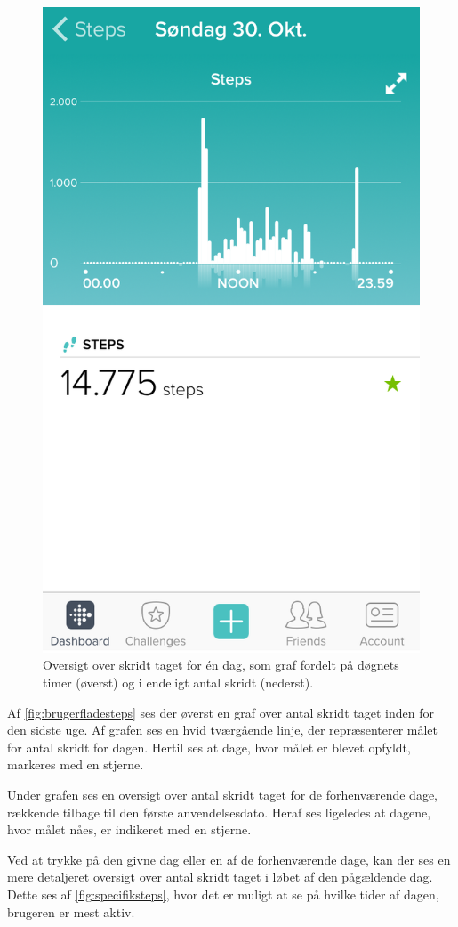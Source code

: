 \begin{figure}[H]
\begin{minipage}{0.48\textwidth}
		\includegraphics[width=0.8\linewidth]{figures/specifiksteps}
		\caption{Oversigt over skridt taget for én dag, som graf fordelt på døgnets timer (øverst) og i endeligt antal skridt (nederst).}
		 \label{fig:specifiksteps}
	\end{minipage}
\end{figure}

\noindent
Af \autoref{fig:brugerfladesteps} ses der øverst en graf over antal skridt taget inden for den sidste uge. Af grafen ses en hvid tværgående linje, der repræsenterer målet for antal skridt for dagen. Hertil ses at dage, hvor målet er blevet opfyldt, markeres med en stjerne.

Under grafen ses en oversigt over antal skridt taget for de forhenværende dage, rækkende tilbage til den første anvendelsesdato. Heraf ses ligeledes at dagene, hvor målet nåes, er indikeret med en stjerne. 

Ved at trykke på den givne dag eller en af de forhenværende dage, kan der ses en mere detaljeret oversigt over antal skridt taget i løbet af den pågældende dag. Dette ses af \autoref{fig:specifiksteps}, hvor det er muligt at se på hvilke tider af dagen, brugeren er mest aktiv.  


